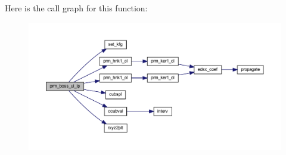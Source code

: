 Here is the call graph for this function\+:\nopagebreak
\begin{figure}[H]
\begin{center}
\leavevmode
\includegraphics[width=350pt]{Leroi__c_8f90_a8fe568053ec398fc50ab206827a43d81_cgraph}
\end{center}
\end{figure}
\mbox{\label{Leroi__c_8f90_ab6689c64fba851d3db437dbd7fc0d13a}} 
